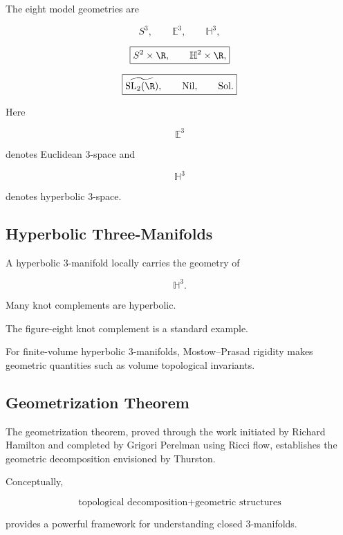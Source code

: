 The eight model geometries are

\[
\boxed{
S^3,
\qquad
\mathbb{E}^3,
\qquad
\mathbb{H}^3,
}
\]

\[
\boxed{
S^2\times\R,
\qquad
\mathbb{H}^2\times\R,
}
\]

\[
\boxed{
\widetilde{\mathrm{SL}_2(\R)},
\qquad
\mathrm{Nil},
\qquad
\mathrm{Sol}.
}
\]

Here

\[
\mathbb{E}^3
\]

denotes Euclidean \(3\)-space and

\[
\mathbb{H}^3
\]

denotes hyperbolic \(3\)-space.

\subsection{Hyperbolic Three-Manifolds}
\label{subsec:hyperbolic-three-manifolds}

A hyperbolic \(3\)-manifold locally carries the geometry of

\[
\mathbb{H}^3.
\]

Many knot complements are hyperbolic.

The figure-eight knot complement is a standard example.

For finite-volume hyperbolic \(3\)-manifolds, Mostow--Prasad rigidity makes
geometric quantities such as volume topological invariants.

\subsection{Geometrization Theorem}
\label{subsec:geometrization-theorem}

The geometrization theorem, proved through the work initiated by Richard
Hamilton and completed by Grigori Perelman using Ricci flow, establishes the
geometric decomposition envisioned by Thurston.

Conceptually,

\[
\boxed{
\text{topological decomposition}
+
\text{geometric structures}
}
\]

provides a powerful framework for understanding closed \(3\)-manifolds.

